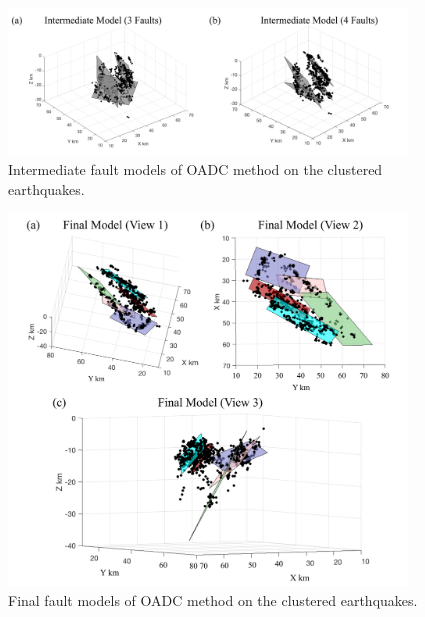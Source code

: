 \documentclass[draft]{agujournal2018}
\begin{document}
\begin{figure}[ht]
\centering
\includegraphics[width=25pc]{Figures/OADC_fig_2.png}
\caption{Intermediate fault models of OADC method on the clustered earthquakes.}
\label{figsix}
\end{figure}


\begin{figure}[ht]
\centering
\includegraphics[width=25pc]{Figures/OADC_fig_4.png}
\caption{Final fault models of OADC method on the clustered earthquakes.}
\label{figsix}
\end{figure}
\end{document}
